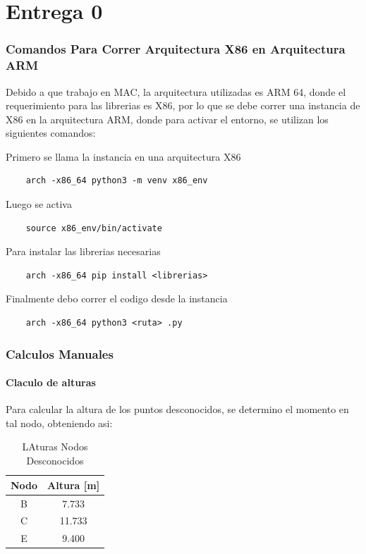 \part{Entrega 0}

\section{Comandos Para Correr Arquitectura X86 en Arquitectura ARM}

Debido a que trabajo en MAC, la arquitectura utilizadas es ARM 64, donde el requerimiento para las librerias es X86, por lo que se debe correr una instancia de X86 en la arquitectura ARM, donde para activar el entorno, se utilizan los siguientes comandos:

Primero se llama la instancia en una arquitectura X86

\begin{verbatim}
    arch -x86_64 python3 -m venv x86_env
\end{verbatim}

Luego se activa

\begin{verbatim}
    source x86_env/bin/activate
\end{verbatim}

Para instalar las librerias necesarias

\begin{verbatim}
    arch -x86_64 pip install <librerias>
\end{verbatim}

Finalmente debo correr el codigo desde la instancia

\begin{verbatim}
    arch -x86_64 python3 <ruta> .py
\end{verbatim}


\section{Calculos Manuales}

\subsection{Claculo de alturas}

Para calcular la altura de los puntos desconocidos, se determino el momento en tal nodo, obteniendo asi:

\begin{table}[H]
    \centering
    \begin{tabular}{|c|c|}
    \hline
    \textbf{Nodo} & \textbf{Altura [m]}  \\ 
    \hline
    B & 7.733  \\ 
    C & 11.733  \\ 
    E & 9.400 \\ 
    \hline
    \end{tabular}
    \caption{LAturas Nodos Desconocidos}
\end{table}

